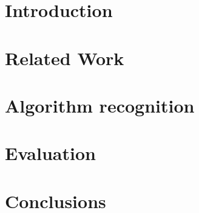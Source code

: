 \documentclass[a4paper,12pt,twoside]{report}
\theoremstyle{definition}
\begin{document}
\chapter{Introduction}\label{chapter:introduction}
\setcounter{page}{0}


\clearemptydoublepage

\chapter{Related Work}\label{chapter:related_work}


\clearemptydoublepage

\chapter{Algorithm recognition}\label{chapter:algorithm_recognition}


\clearemptydoublepage

\chapter{Evaluation}\label{chapter:evaluation}


\clearemptydoublepage

\chapter{Conclusions}\label{chapter:conclusions}


\clearemptydoublepage

%



\clearemptydoublepage

\appendix
{}


\end{document}
